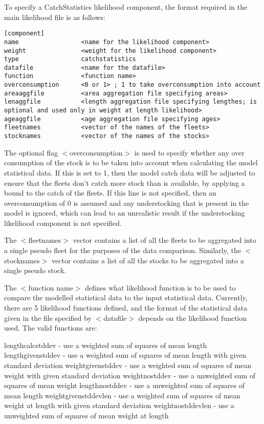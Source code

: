 \documentclass[10pt,twoside]{book}
\begin{document}
\bigskip
To specify a CatchStatistics likelihood component, the format required in the main likelihood file is as follows:

{\small\begin{verbatim}
[component]
name                 <name for the likelihood component>
weight               <weight for the likelihood component>
type                 catchstatistics
datafile             <name for the datafile>
function             <function name>
overconsumption      <0 or 1> ; 1 to take overconsumption into account
areaaggfile          <area aggregation file specifying areas>
lenaggfile			 <length aggregation file specifying lengthes; is optional and used only in weight at length likelihood>
ageaggfile           <age aggregation file specifying ages>
fleetnames           <vector of the names of the fleets>
stocknames           <vector of the names of the stocks>
\end{verbatim}}

The optional flag $<$overconsumption$>$ is used to specify whether any over consumption of the stock is to be taken into account when calculating the model statistical data.  If this is set to 1, then the model catch data will be adjusted to ensure that the fleets don't catch more stock than is available, by applying a bound to the catch of the fleets.  If this line is not specified, then an overconsumption of 0 is assumed and any understocking that is present in the model is ignored, which can lead to an unrealistic result if the understocking likelihood component is not specified.

\bigskip
The $<$fleetnames$>$ vector contains a list of all the fleets to be aggregated into a single pseudo fleet for the purposes of the data comparison.  Similarly, the $<$stocknames$>$ vector contains a list of all the stocks to be aggregated into a single pseudo stock.

\bigskip
The $<$function name$>$ defines what likelihood function is to be used to compare the modelled statistical data to the input statistical data.  Currently, there are 5 likelihood functions defined, and the format of the statistical data given in the file specified by $<$datafile$>$ depends on the likelihood function used.  The valid functions are:

\bigskip
lengthcalcstddev - use a weighted sum of squares of mean length\newline
lengthgivenstddev - use a weighted sum of squares of mean length with given standard deviation\newline
weightgivenstddev - use a weighted sum of squares of mean weight with given standard deviation\newline
weightnostddev - use a unweighted sum of squares of mean weight\newline
lengthnostddev - use a unweighted sum of squares of mean length\newline
weightgivenstddevlen - use a weighted sum of squares of mean weight at length with given standard deviation\newline
weightnostddevlen - use a unweighted sum of squares of mean weight at length
\end{document}
